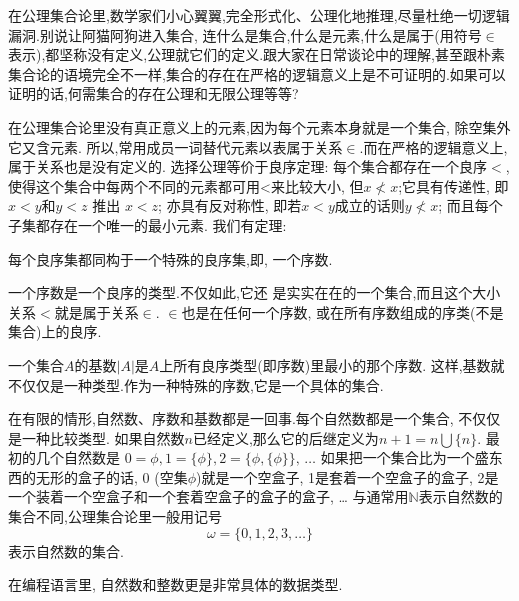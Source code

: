 {在公理集合论里,数学家们小心翼翼,完全形式化、公理化地推理,尽量杜绝一切逻辑漏洞.别说让阿猫阿狗进入集合, 连什么是集合,什么是元素,什么是属于(用符号$\in$表示),都坚称没有定义,公理就它们的定义.跟大家在日常谈论中的理解,甚至跟朴素集合论的语境完全不一样,集合的存在在严格的逻辑意义上是不可证明的.如果可以证明的话,何需集合的存在公理和无限公理等等?

在公理集合论里没有真正意义上的元素,因为每个元素本身就是一个集合, 除空集外它又含元素. 所以,常用成员一词替代元素以表属于关系$\in$.而在严格的逻辑意义上,属于关系也是没有定义的.
选择公理等价于良序定理: 每个集合都存在一个良序$<$,使得这个集合中每两个不同的元素都可用<来比较大小, 但$x\nless x$;它具有传递性, 即 $x<y$和$y<z$ 推出 $x<z$; 
亦具有反对称性, 即若$x<y$成立的话则$y\nless x$;
而且每个子集都存在一个唯一的最小元素.
我们有定理:
\begin{kaishu}每个良序集都同构于一个特殊的良序集,即,
一个序数.
\end{kaishu}一个序数是一个良序的类型.不仅如此,它还
是实实在在的一个集合,而且这个大小关系$<$就是属于关系$\in$.
$\in$也是在任何一个序数, 或在所有序数组成的序类(不是集合)上的良序.

一个集合$A$的基数$|A|$是$A$上所有良序类型(即序数)里最小的那个序数.
这样,基数就不仅仅是一种类型.作为一种特殊的序数,它是一个具体的集合.

在有限的情形,自然数、序数和基数都是一回事.每个自然数都是一个集合,
不仅仅是一种比较类型.
如果自然数$n$已经定义,那么它的后继定义为$n+1= n\bigcup \{n\}$.
最初的几个自然数是
$0 = \phi, 1 = \{\phi\}, 2 = \{\phi, \{\phi\}\}, \,\dots$
如果把一个集合比为一个盛东西的无形的盒子的话, 0 (空集$\phi$)就是一个空盒子, 1是套着一个空盒子的盒子,
2是一个装着一个空盒子和一个套着空盒子的盒子的盒子, \dots
与通常用$\mathbb{N}$表示自然数的集合不同,公理集合论里一般用记号
$$\omega = \{0, 1, 2, 3, \dots\}$$
表示自然数的集合.

} %

在编程语言里, 自然数和整数更是非常具体的数据类型.

